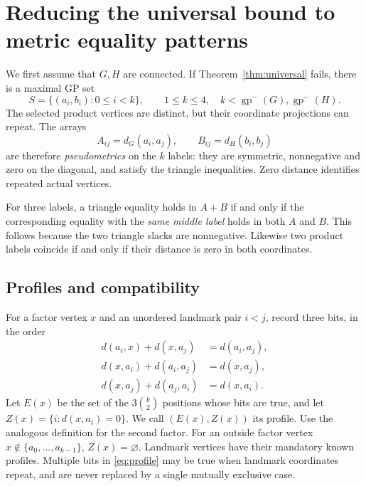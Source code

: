 \documentclass[11pt]{article}
\theoremstyle{definition}
\theoremstyle{remark}
\newcommand{\lgp}{\operatorname{gp}^{-}}
\begin{document}
\section{Reducing the universal bound to metric equality patterns}
\label{sec:metric}

We first assume that $G,H$ are connected. If Theorem~\ref{thm:universal}
fails, there is a maximal GP set
\[
 S=\{(a_i,b_i):0\leq i<k\},\qquad
 1\leq k\leq4,\quad k<\lgp(G),\lgp(H).
\]
The selected product vertices are distinct, but their coordinate projections
can repeat. The arrays
\[
 A_{ij}=d_G(a_i,a_j),\qquad B_{ij}=d_H(b_i,b_j)
\]
are therefore \emph{pseudometrics} on the $k$ labels: they are symmetric,
nonnegative and zero on the diagonal, and satisfy the triangle inequalities.
Zero distance identifies repeated actual vertices.

For three labels, a triangle equality holds in $A+B$ if and only if the
corresponding equality with the \emph{same middle label} holds in both $A$
and $B$. This follows because the two triangle slacks are nonnegative.
Likewise two product labels coincide if and only if their distance is zero
in both coordinates.

\subsection{Profiles and compatibility}

For a factor vertex $x$ and an unordered landmark pair $i<j$, record three
bits, in the order
\begin{equation}\label{eq:profile}
 \begin{split}
 d(a_i,x)+d(x,a_j)&=d(a_i,a_j),\\
 d(x,a_i)+d(a_i,a_j)&=d(x,a_j),\\
 d(x,a_j)+d(a_j,a_i)&=d(x,a_i).
 \end{split}
\end{equation}
Let $E(x)$ be the set of the $3\binom{k}{2}$ positions whose bits are true,
and let $Z(x)=\{i:d(x,a_i)=0\}$. We call $(E(x),Z(x))$ its profile.
Use the analogous definition for the second factor. For an outside factor
vertex $x\notin\{a_0,\ldots,a_{k-1}\}$, $Z(x)=\varnothing$.
Landmark vertices have their mandatory known profiles. Multiple bits in
\eqref{eq:profile} may be true when landmark coordinates repeat, and are
never replaced by a single mutually exclusive case.
\end{document}
